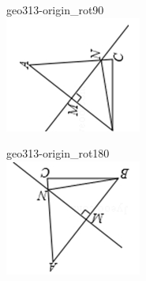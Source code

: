 \documentclass[12pt]{article}
\begin{document}
\begin{center}
\hfill\begin{minipage}{0.32\textwidth}\centering
geo313-origin\_rot90\\
\includegraphics[width=0.95\linewidth]{out_rommath_origin/items/geo313-origin/assets/figure_rot90.png}
\end{minipage}
\par\medskip
\begin{minipage}{0.32\textwidth}\centering
geo313-origin\_rot180\\
\includegraphics[width=0.95\linewidth]{out_rommath_origin/items/geo313-origin/assets/figure_rot180.png}

\end{minipage}
\end{center}
\end{document}
